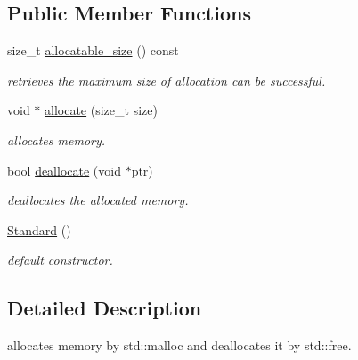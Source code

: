 \subsection*{Public Member Functions}
\begin{DoxyCompactItemize}
\item 
\hypertarget{classhryky_1_1memory_1_1heap_1_1_standard_a55f1b34ebacf9ceec6b8b1e47d8897b1}{size\-\_\-t \hyperlink{classhryky_1_1memory_1_1heap_1_1_standard_a55f1b34ebacf9ceec6b8b1e47d8897b1}{allocatable\-\_\-size} () const }\label{classhryky_1_1memory_1_1heap_1_1_standard_a55f1b34ebacf9ceec6b8b1e47d8897b1}

\begin{DoxyCompactList}\small\item\em retrieves the maximum size of allocation can be successful. \end{DoxyCompactList}\item 
\hypertarget{classhryky_1_1memory_1_1heap_1_1_standard_a48a73df7e7924d9ae0a840673ca900a4}{void $\ast$ \hyperlink{classhryky_1_1memory_1_1heap_1_1_standard_a48a73df7e7924d9ae0a840673ca900a4}{allocate} (size\-\_\-t size)}\label{classhryky_1_1memory_1_1heap_1_1_standard_a48a73df7e7924d9ae0a840673ca900a4}

\begin{DoxyCompactList}\small\item\em allocates memory. \end{DoxyCompactList}\item 
\hypertarget{classhryky_1_1memory_1_1heap_1_1_standard_adff68312e5eabe5c096386a45348f968}{bool \hyperlink{classhryky_1_1memory_1_1heap_1_1_standard_adff68312e5eabe5c096386a45348f968}{deallocate} (void $\ast$ptr)}\label{classhryky_1_1memory_1_1heap_1_1_standard_adff68312e5eabe5c096386a45348f968}

\begin{DoxyCompactList}\small\item\em deallocates the allocated memory. \end{DoxyCompactList}\item 
\hyperlink{classhryky_1_1memory_1_1heap_1_1_standard_adcfec991c70fc90a1d022b79b87fedaf}{Standard} ()
\begin{DoxyCompactList}\small\item\em default constructor. \end{DoxyCompactList}\end{DoxyCompactItemize}


\subsection{Detailed Description}
allocates memory by std\-::malloc and deallocates it by std\-::free. 

